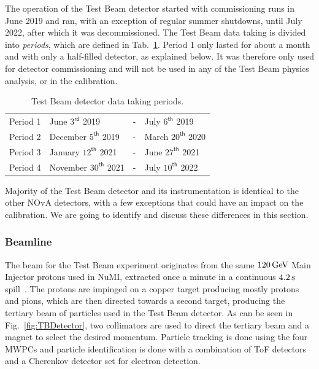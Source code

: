 The operation of the Test Beam detector started with commissioning runs in June 2019 and ran, with an exception of regular summer shutdowns, until July 2022, after which it was decommissioned. The Test Beam data taking is divided into \textit{periods}, which are defined in Tab.~\ref{tab:TestBeamPeriods}. Period 1 only lasted for about a month and with only a half-filled detector, as explained below. It was therefore only used for detector commissioning and will not be used in any of the Test Beam physics analysis, or in the calibration.
\begin{table}[!ht]
\centering
\caption{Test Beam detector data taking periods.}
\def\arraystretch{1.4}
\begin{tabular}{l@{\hskip 1in}lcl}
Period 1 & June $3^{\textsf{rd}}$ 2019 & - & July $6^{\textsf{th}}$ 2019\\
Period 2 & December $5^{\textsf{th}}$ 2019 & - & March $20^{\textsf{th}}$ 2020\\
Period 3 & January $12^{\textsf{th}}$ 2021 & - & June $27^{\textsf{th}}$ 2021\\
Period 4 & November $30^{\textsf{th}}$ 2021 & - & July $10^{\textsf{th}}$ 2022
\end{tabular}
\label{tab:TestBeamPeriods}
\end{table}

Majority of the Test Beam detector and its instrumentation is identical to the other \gls{NOvA} detectors, with a few exceptions that could have an impact on the calibration. We are going to identify and discuss these differences in this section.


\subsubsection*{Beamline}
The beam for the Test Beam experiment originates from the same $\unit[120]{GeV}$ Main Injector protons used in \gls{NuMI}, extracted once a minute in a continuous $\unit[4.2]{s}$ spill~\cite{NOvATestBeamWallbangProceedings2020.pdf}. The protons are impinged on a copper target producing mostly protons and pions, which are then directed towards a second target, producing the tertiary beam of particles used in the Test Beam detector. As can be seen in Fig.~\ref{fig:TBDetector}, two collimators are used to direct the tertiary beam and a magnet to select the desired momentum. Particle tracking is done using the four \glspl{MWPC} and particle identification is done with a combination of \gls{ToF} detectors and a Cherenkov detector set for electron detection.

